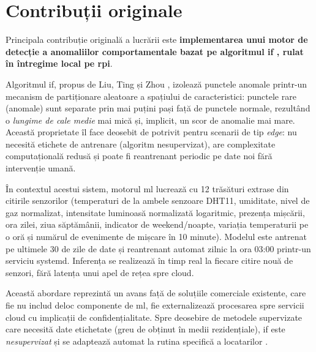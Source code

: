 \section{Contribuții originale}
\label{sec:contributii}

Principala contribuție originală a lucrării este \textbf{implementarea unui motor
de detecție a anomaliilor comportamentale bazat pe algoritmul
\gls{if} \cite{liu2008isolation}, rulat în întregime local pe \gls{rpi}}.

Algoritmul \gls{if}, propus de Liu, Ting și Zhou \cite{liu2008isolation}, izolează
punctele anomale printr-un mecanism de partiționare aleatoare a spațiului de
caracteristici: punctele rare (anomale) sunt separate prin mai puțini pași
față de punctele normale, rezultând o \emph{lungime de cale medie} mai mică și,
implicit, un scor de anomalie mai mare. Această proprietate îl face deosebit de
potrivit pentru scenarii de tip \emph{edge}: nu necesită etichete de antrenare
(algoritm nesupervizat), are complexitate computațională redusă și poate fi
reantrenant periodic pe date noi fără intervenție umană.

În contextul acestui sistem, motorul \gls{ml} lucrează cu 12 trăsături extrase
din citirile senzorilor (temperaturi de la ambele senzoare DHT11, umiditate,
nivel de gaz normalizat, intensitate luminoasă normalizată logaritmic, prezența
mișcării, ora zilei, ziua săptămânii, indicator de weekend/noapte, variația
temperaturii pe o oră și numărul de evenimente de mișcare în 10 minute).
Modelul este antrenat pe ultimele 30 de zile de date și reantrenant automat
zilnic la ora 03:00 printr-un serviciu systemd. Inferența se realizează în timp
real la fiecare citire nouă de senzori, fără latența unui apel de rețea spre
cloud.

Această abordare reprezintă un avans față de soluțiile comerciale existente, care
fie nu includ deloc componente de \gls{ml}, fie externalizează procesarea spre
servicii cloud cu implicații de confidențialitate. Spre deosebire de metodele
supervizate care necesită date etichetate (greu de obținut în medii rezidențiale),
\gls{if} este \emph{nesupervizat} și se adaptează automat la rutina specifică a
locatarilor \cite{chandola2009anomaly,fahim2019anomaly,cook2020anomalyiot}.

